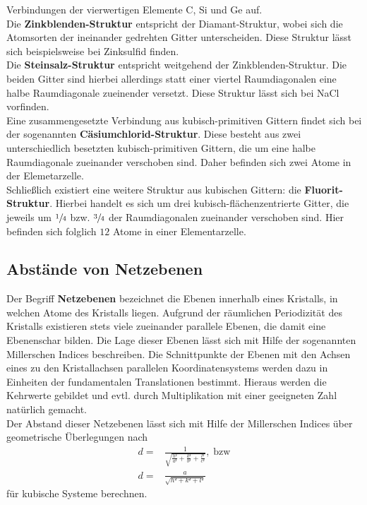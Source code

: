 Verbindungen der vierwertigen Elemente C, Si und Ge auf.\\
Die \textbf{Zinkblenden-Struktur} entspricht der Diamant-Struktur, wobei sich die Atomsorten der ineinander gedrehten
Gitter unterscheiden. Diese Struktur lässt sich beispielsweise bei Zinksulfid finden. \\
Die \textbf{Steinsalz-Struktur} entspricht weitgehend der Zinkblenden-Struktur. Die beiden Gitter sind hierbei allerdings
statt einer viertel Raumdiagonalen eine halbe Raumdiagonale zueinender versetzt. Diese Struktur lässt sich bei NaCl
vorfinden.\\
Eine zusammengesetzte Verbindung aus kubisch-primitiven Gittern findet sich bei der sogenannten \textbf{Cäsiumchlorid-Struktur}.
Diese besteht aus zwei unterschiedlich besetzten kubisch-primitiven Gittern, die um eine halbe Raumdiagonale zueinander verschoben
sind. Daher befinden sich zwei Atome in der Elemetarzelle. \\
Schließlich existiert eine weitere Struktur aus kubischen Gittern: die \textbf{Fluorit-Struktur}. Hierbei handelt es sich um drei
kubisch-flächenzentrierte Gitter, die jeweils um $\sfrac{1}{4}$ bzw. $\sfrac{3}{4}$ der Raumdiagonalen zueinander verschoben sind.
Hier befinden sich folglich $12$ Atome in einer Elementarzelle.
%
\subsection{Abstände von Netzebenen}
%
Der Begriff \textbf{Netzebenen} bezeichnet die Ebenen innerhalb eines Kristalls, in welchen Atome des Kristalls liegen. Aufgrund
der räumlichen Periodizität des Kristalls existieren stets viele zueinander parallele Ebenen, die damit eine Ebenenschar bilden.
Die Lage dieser Ebenen lässt sich mit Hilfe der sogenannten Millerschen Indices beschreiben. Die Schnittpunkte der Ebenen mit den
Achsen eines zu den Kristallachsen parallelen Koordinatensystems werden dazu in Einheiten der fundamentalen Translationen bestimmt.
Hieraus werden die Kehrwerte gebildet und evtl. durch Multiplikation mit einer geeigneten Zahl natürlich gemacht.\\
Der Abstand dieser Netzebenen lässt sich mit Hilfe der Millerschen Indices über geometrische Überlegungen nach
%
\begin{align}
  d=&\frac{1}{\sqrt{\frac{h²}{a²}+\frac{k²}{b²}+\frac{l²}{c²}}}, \; \text{bzw} \\
  d=&\frac{a}{\sqrt{h²+k²+l²}}
  \label{eq:d}
\end{align}
%
für kubische Systeme berechnen.
%
